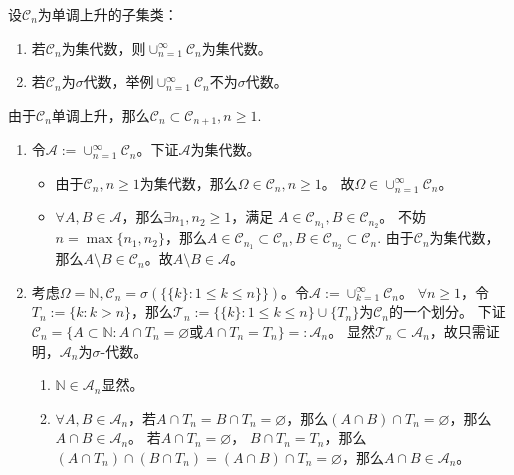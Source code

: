 \documentclass{ctexart}
\begin{document}
\begin{problem} 
  设\(\mathcal{C}_n \)为单调上升的子集类：
  \begin{enumerate}
    \item 若\(\mathcal{C}_n \)为集代数，则\(\cup_{n=1}^{\infty}\mathcal{C}_n \)为集代数。
    \item 若\(\mathcal{C}_n \)为\(\sigma \)代数，举例\(\cup_{n=1}^{\infty}\mathcal{C}_n \)不为\(\sigma \)代数。
  \end{enumerate}
\end{problem}
\begin{solution}
由于\(\mathcal{C}_n \)单调上升，那么\(\mathcal{C}_n \subset \mathcal{C}_{n + 1}, n \geq 1 \).
\begin{enumerate}
  \item 令\(\mathcal{A}:=\cup_{n=1}^{\infty} \mathcal{C}_n \)。下证\(\mathcal{A} \)为集代数。
    \begin{itemize}
      \item 由于\(\mathcal{C}_n,n \geq 1\)为集代数，那么\(\Omega \in \mathcal{C}_n ,n \geq 1 \)。 故\(\Omega \in \cup_{n=1}^{\infty} \mathcal{C}_n \)。
      \item \(\forall A,B \in \mathcal{A} \)，那么\(\exists n_1,n_2 \geq 1 \)，满足 \(A \in \mathcal{C}_{n_1},B \in \mathcal{C}_{n_2} \)。
        不妨\(n = \max\{n_1,n_2\} \)，那么\(A \in \mathcal{C}_{n_1} \subset \mathcal{C}_n, B \in \mathcal{C}_{n_2} \subset \mathcal{C}_n\).
        由于\(\mathcal{C}_n \)为集代数，那么\(A \setminus B \in \mathcal{C}_n \)。故\(A \setminus B \in \mathcal{A} \)。
    \end{itemize}
  \item 考虑\(\Omega=\mathbb{N},\mathcal{C}_n=\sigma(\{\{k\}: 1 \leq k \leq n\}\}) \)。令\( \mathcal{A}:=\cup_{k=1}^{\infty}\mathcal{C}_n\)。
    \(\forall n \geq 1 \)，令\(T_n:=\{k: k >n\} \)，那么\(\mathcal{T}_n:=\{\{k\} : 1 \leq k \leq n\} \cup \{T_n\} \)为\(\mathcal{C}_n \)的一个划分。
    下证\(\mathcal{C}_n=\{A \subset \mathbb{N}: A \cap T_n = \varnothing \text{或} A \cap T_n =T_n\}=:\mathcal{A}_n \)。
    显然\( \mathcal{T}_n \subset \mathcal{A}_n\)，故只需证明，\(\mathcal{A}_n \)为\(\sigma \)-代数。
    \begin{enumerate}
      \item \(\mathbb{N} \in \mathcal{A}_n \)显然。
      \item \(\forall A,B  \in \mathcal{A}_n\)，若\(A \cap T_n=B \cap T_n=\varnothing \)，那么\((A \cap B) \cap T_n =\varnothing \)，那么\(A \cap B \in \mathcal{A}_n \)。
        若\(A \cap T_n = \varnothing \)， \(B \cap T_n =T_n \)，那么\((A \cap T_n) \cap (B \cap T_n)=(A \cap B) \cap T_n=\varnothing \)，那么\(A \cap B \in \mathcal{A}_n \)。

\end{enumerate}
\end{enumerate}
\end{solution}
\end{document}
